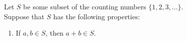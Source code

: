 \documentclass[solutions,answers]{exam}
\begin{document}
\begin{questions}
\question
Let $S$ be some subset of the counting numbers $\{1,2,3,\ldots \}$. \\Suppose that $S$ has the following properties:
\begin{enumerate}
\item If $a,b\in S$, then $a+b\in S$.\\
\end{enumerate}


\end{questions}
\end{document}
